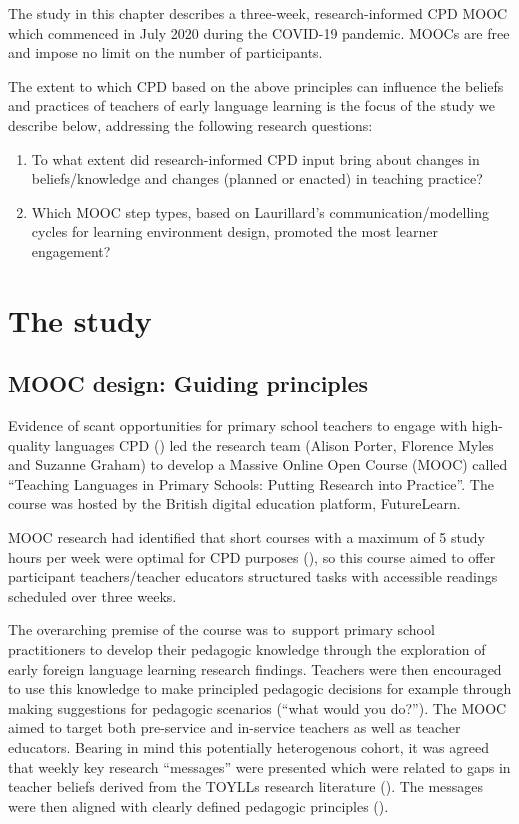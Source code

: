 \documentclass[output=paper]{langscibook}
\begin{document}
\begin{sloppypar}
The study in this chapter describes a three-week, research-informed CPD MOOC which commenced in  July 2020  during the COVID-19 pandemic. MOOCs are free and impose no limit on the number of participants.
\end{sloppypar}

The extent to which CPD based on the above principles can influence the beliefs and practices of teachers of early language learning is the focus of the study we describe below, addressing the following research questions: 

\begin{enumerate}
  \item To what extent did research-informed CPD input bring about changes in beliefs/knowledge and changes (planned or enacted) in teaching practice?
  \item Which MOOC step types, based on Laurillard’s communication/modelling cycles for learning environment design, promoted the most learner engagement?
\end{enumerate}

\section{The study}\label{sec:porter:2}
\subsection{MOOC design: Guiding principles}\label{sec:porter:2.1}

Evidence of scant opportunities for primary school teachers to engage with high-quality languages CPD (\citealt{TinsleyBoard2017}) led the research team (Alison Porter, Florence Myles and Suzanne Graham) to develop a Massive Online Open Course (MOOC) called ``Teaching Languages in Primary Schools: Putting Research into Practice''. The course was hosted by the British digital education platform, FutureLearn.

MOOC research had identified that short courses with a maximum of 5 study hours per week were optimal for CPD purposes (\citealt{Laurillard2014}), so this course aimed to offer participant teachers/teacher educators structured tasks with accessible readings scheduled over three weeks.

The overarching premise of the course was to~support primary school practitioners to develop their pedagogic knowledge through the exploration of early foreign language learning research findings. Teachers were then encouraged to use this knowledge to make principled pedagogic decisions for example through making suggestions for pedagogic scenarios (``what would you do?''). The MOOC aimed to target both pre-service and in-service teachers as well as teacher educators. Bearing in mind this potentially heterogenous cohort, it was agreed that weekly key research ``messages'' were presented which were related to gaps in teacher beliefs derived from the TOYLLs research literature (). The messages were then aligned with clearly defined pedagogic principles ().
\end{document}
